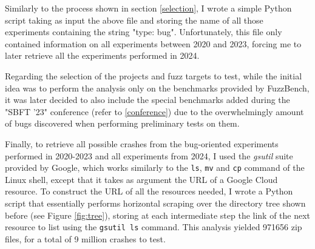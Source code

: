 Similarly to the process shown in section \ref{selection}, I wrote a simple Python script taking as input the above file and storing the name of all those experiments containing the string "type: bug". Unfortunately, this file only contained information on all experiments between 2020 and 2023, forcing me to later retrieve all the experiments performed in 2024.

Regarding the selection of the projects and fuzz targets to test, while the initial idea was to perform the analysis only on the benchmarks provided by FuzzBench, it was later decided to also include the special benchmarks added during the "SBFT '23" conference (refer to \ref{conference}) due to the overwhelmingly amount of bugs discovered when performing preliminary tests on them.

Finally, to retrieve all possible crashes from the bug-oriented experiments performed in 2020-2023 and all experiments from 2024, I used the \textit{gsutil} suite provided by Google, which works similarly to the \verb|ls|, \verb|mv| and \verb|cp| command of the Linux shell, except that it takes as argument the URL of a Google Cloud resource. To construct the URL of all the resources needed, I wrote a Python script that essentially performs horizontal scraping over the directory tree shown before (see Figure \ref{fig:tree}), storing at each intermediate step the link of the next resource to list using the \verb|gsutil ls| command. This analysis yielded 971656 zip files, for a total of 9 million crashes to test.
\newline


